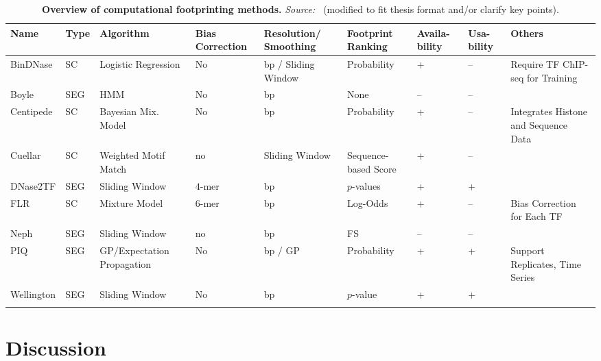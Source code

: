 \begin{footnotesize}
\begin{longtable}{p{1.4cm}p{0.6cm}p{1.7cm}p{1.3cm}p{1.6cm}p{1.6cm}p{0.8cm}p{0.8cm}p{2cm}}
\caption[Overview of computational footprinting methods]{\textbf{Overview of computational footprinting methods.} \emph{Source:~\cite{gusmao2016}} (modified to fit thesis format and/or clarify key points).} \\[-0.3cm]
  \hline
    Name & Type & Algorithm & Bias Correction & Resolution/ Smoothing & Footprint Ranking & Availa- bility & Usa- bility & Others\\
  \hline
    BinDNase & SC & Logistic Regression & No & bp / Sliding Window & Probability & + & -- & Require TF ChIP-seq for Training\\
    Boyle & SEG & HMM & No & bp & None & -- & -- & \\
    Centipede & SC & Bayesian Mix. Model & No & bp & Probability & + & -- & Integrates Histone and Sequence Data\\
    Cuellar & SC & Weighted Motif Match & no & Sliding Window & Sequence-based Score & + & -- & \\
    DNase2TF & SEG & Sliding Window & $4$-mer & bp & $p$-values & + & + & \\
    FLR & SC & Mixture Model & $6$-mer & bp & Log-Odds & + & -- & Bias Correction for Each TF\\
    Neph & SEG & Sliding Window & no & bp & FS & -- & -- & \\
    PIQ & SEG & GP/Expectation Propagation & No & bp / GP & Probability & + & + & Support Replicates, Time Series\\
    Wellington & SEG & Sliding Window & No & bp & $p$-value & + & + & \\
  \hline
\label{tab:overview_methods} \\
\end{longtable}
\end{footnotesize}

\section{Discussion}
\label{sec:discussion.2}


